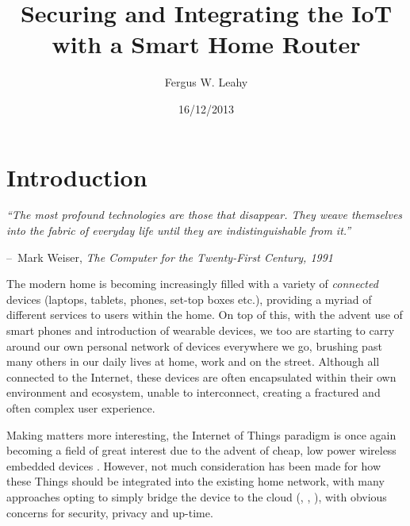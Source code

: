 \documentclass{mprop}
\makeatletter
\newenvironment{chapquote}[2][2em]
  {\setlength{\@tempdima}{#1}%
   \def\chapquote@author{#2}%
   \parshape 1 \@tempdima \dimexpr\textwidth-2\@tempdima\relax%
   \itshape}
  {\par\normalfont\hfill--\ \chapquote@author\hspace*{\@tempdima}\par\bigskip}
\makeatother
\begin{document}
\title{Securing and Integrating the IoT with a Smart Home Router}
\author{Fergus W. Leahy}
\date{16/12/2013}
\maketitle

\tableofcontents
\newpage

\section{Introduction}
\label{sec:introduction}

\begin{chapquote}{Mark Weiser, \textit{The Computer for the Twenty-First Century, 1991}}
    ``The most profound technologies are those that disappear. They weave themselves into the fabric of everyday life until they are indistinguishable from it.''
\end{chapquote}

The modern home is becoming increasingly filled with a variety of \textit{connected} devices (laptops, tablets, phones, set-top boxes etc.), providing a myriad of different services to users within the home. On top of this, with the advent use of smart phones and introduction of wearable devices, we too are starting to carry around our own personal network of devices everywhere we go, brushing past many others in our daily lives at home, work and on the street. Although all connected to the Internet, these devices are often encapsulated within their own environment and ecosystem, unable to interconnect, creating a fractured and often complex user experience. 

Making matters more interesting, the Internet of Things paradigm is once again becoming a field of great interest due to the advent of cheap, low power wireless embedded devices \cite{2013IoT}. However, not much consideration has been made for how these Things should be integrated into the existing home network, with many approaches opting to simply bridge the device to the cloud (\cite{SmartThings}, \cite{Twine}, \cite{IETF_CORE}), with obvious concerns for security, privacy and up-time.
\end{document}
